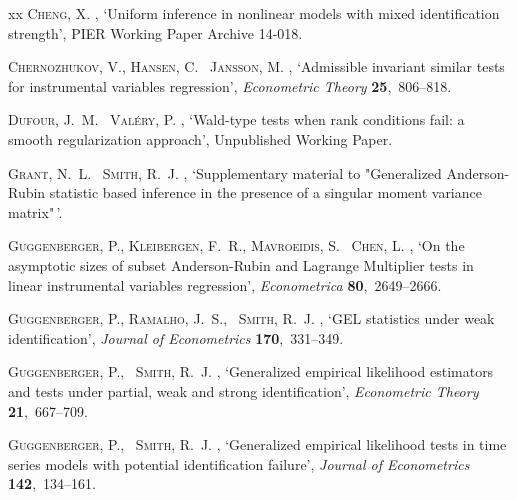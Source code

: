 \documentclass[hidelinks, 11 pt, a4paper, pdflatex]{article}
\begin{document}
{\begin{thebibliography}{xx}
 \textsc{Cheng, X.}  \harvardyearright ,
  `Uniform inference in nonlinear models with mixed identification strength',
  PIER Working Paper Archive 14-018.

 \textsc{Chernozhukov, V., Hansen, C. \harvardand\ Jansson, M.}  \harvardyearright ,
  `Admissible invariant similar tests for instrumental variables regression',
  {\em Econometric Theory} {\bf 25},~806--818.

 \textsc{Dufour, J.~M. \harvardand\ Val\'{e}ry, P.}  \harvardyearright ,
  `Wald-type tests when rank conditions fail: a smooth regularization approach',
  Unpublished Working Paper.

 \textsc{Grant, N.~L. \harvardand\ Smith, R.~J.}  \harvardyearright ,
  `Supplementary material to "Generalized Anderson-Rubin statistic based inference in the presence of a singular moment variance matrix"\,'.

 \textsc{Guggenberger, P., Kleibergen, F.~R.,  Mavroeidis, S.  \harvardand\ Chen, L.}  \harvardyearright ,
  `On the asymptotic sizes of subset Anderson-Rubin and Lagrange Multiplier tests in linear instrumental variables regression',
  {\em Econometrica} {\bf 80},~2649--2666.

 \textsc{Guggenberger, P., Ramalho, J.~S., \harvardand\ Smith, R.~J.}  \harvardyearright ,
  `GEL statistics under weak identification',
  {\em Journal of Econometrics} {\bf 170},~331--349.

 \textsc{Guggenberger, P., \harvardand\ Smith, R.~J.}  \harvardyearright ,
  `Generalized empirical likelihood estimators and tests under partial, weak and strong identification',
  {\em Econometric Theory} {\bf 21},~667--709.

 \textsc{Guggenberger, P., \harvardand\ Smith, R.~J.}  \harvardyearright ,
  `Generalized empirical likelihood tests in time series models with potential identification failure',
  {\em Journal of Econometrics} {\bf 142},~134--161.


\end{thebibliography}}
\end{document}

